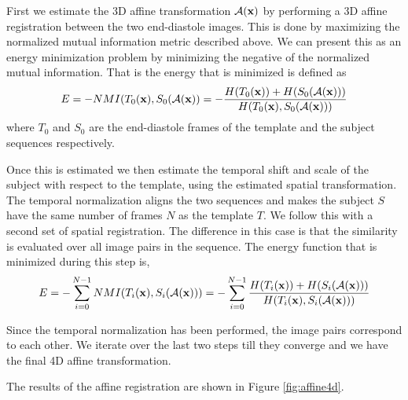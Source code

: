 First we estimate the 3D affine transformation $\mathcal{A}(\mathbf{x})$ by performing a 3D affine registration between the two end-diastole images. This is done by maximizing the normalized mutual information metric described above. We can present this as an energy minimization problem by minimizing the negative of the normalized mutual information. That is the energy that is minimized is defined as
\begin{equation}
E = -NMI(T_0(\mathbf{x}), S_0(\mathcal{A}(\mathbf{x})) = -\frac{H(T_0(\mathbf{x})) + H(S_0(\mathcal{A}(\mathbf{x})))}{H(T_0(\mathbf{x}),S_0(\mathcal{A}(\mathbf{x})))}
\end{equation}
where $T_0$ and $S_0$ are the end-diastole frames of the template and the subject sequences respectively.

Once this is estimated we then estimate the temporal shift and scale of the subject with respect to the template, using the estimated spatial transformation. The temporal normalization aligns the two sequences and makes the subject $S$ have the same number of frames $N$ as the template $T$. We follow this with a second set of spatial registration. The difference in this case is that the similarity is evaluated over all image pairs in the sequence. The energy function that is minimized during this step is,
\begin{equation}
E = -\sum_{i=0}^{N-1}NMI(T_i(\mathbf{x}), S_i(\mathcal{A}(\mathbf{x})))=-\sum_{i=0}^{N-1}\frac{H(T_i(\mathbf{x})) + H(S_i(\mathcal{A}(\mathbf{x})))}{H(T_i(\mathbf{x}),S_i(\mathcal{A}(\mathbf{x})))}
\end{equation}

Since the temporal normalization has been performed, the image pairs correspond to each other. We iterate over the last two steps till they converge and we have the final 4D affine transformation.

The results of the affine registration are shown in Figure \ref{fig:affine4d}.

